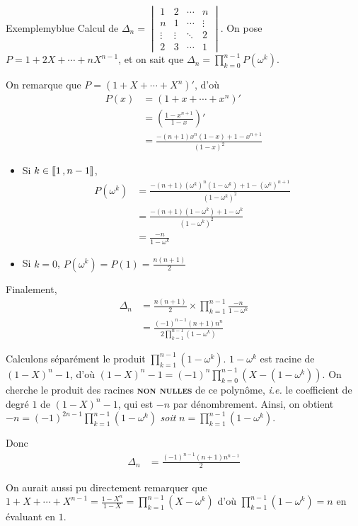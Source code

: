     \begin{omed}{Exemple}{myblue}
        Calcul de $\Delta_n = \begin{vmatrix}
            1 & 2 & \cdots & n \\
            n & 1 & \cdots & \vdots \\
            \vdots & \vdots & \ddots & 2 \\
            2 & 3 & \cdots & 1
        \end{vmatrix}$. On pose $P = 1 + 2X + \cdots + n X^{n-1}$, et on sait que $\Delta_n = \prod_{k=0}^{n-1} P(\omega^k)$.

        On remarque que $P = (1 + X + \cdots + X^n)'$, d’où
        \begin{align*}
            P(x) 
            &= (1 + x + \cdots + x^n)'\\
            &= \left(\frac{1-x^{n+1}}{1-x}\right)' \\
            &= \frac{-(n+1)x^n (1-x) + 1 - x^{n+1}}{(1-x)^2}
        \end{align*}
        \begin{itemize}
            \item Si $k \in \left\llbracket 1 \, , n-1 \right\rrbracket$,
            \begin{align*}
                P(\omega^k) 
                &= \frac{-(n+1)(\omega^k)^n (1 - \omega^k) + 1 - (\omega^k)^{n+1}}{(1 - \omega^k)^2} \\
                &= \frac{-(n+1)(1 - \omega^k) + 1 - \omega^k}{(1 - \omega^k)^2} \\
                & = \frac{-n}{1 - \omega^k}
            \end{align*}
            \item Si $k = 0$, $P(\omega^k) = P(1) = \frac{n(n+1)}{2}$
        \end{itemize}
        Finalement, 
        \begin{align*}
            \Delta_n
            &= \frac{n(n+1)}{2} \times \prod_{k=1}^{n-1} \frac{-n}{1 - \omega^k} \\
            &= \frac{(-1)^{n-1}(n+1)n^n}{2 \prod_{k=1}^{n-1}(1 - \omega^k)} 
        \end{align*}

        Calculons séparément le produit $\prod_{k=1}^{n-1} (1 - \omega^k)$. $1 - \omega^k$ est racine de $(1 - X)^n - 1$, d'où $(1 - X)^n - 1 = (-1)^n \prod_{k=0}^{n-1} (X - (1- \omega^k))$. On cherche le produit des racines \textsc{\textbf{non nulles}} de ce polynôme, \textit{i.e.} le coefficient de degré $1$ de $(1 - X)^n -1$, qui est $-n$ par dénombrement. Ainsi, on obtient $-n = (-1)^{2n-1} \prod_{k=1}^{n-1} (1 - \omega^k)$ \textit{soit} $n = \prod_{k=1}^{n-1} (1 - \omega^k)$.

        Donc 
        \begin{align*}
            \Delta_n 
            &= \frac{(-1)^{n-1} (n+1) n^{n-1}}{2}
        \end{align*}

        On aurait aussi pu directement remarquer que $1 + X + \cdots + X^{n-1} = \frac{1 - X^n}{1 - X} = \prod_{k=1}^{n-1} (X - \omega^k)$ d’où $\prod_{k=1}^{n-1} (1 - \omega^k) = n$ en évaluant en $1$.
    \end{omed}


